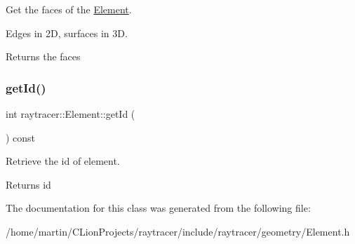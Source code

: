 Get the faces of the \hyperlink{classraytracer_1_1Element}{Element}. 

Edges in 2D, surfaces in 3D. \begin{DoxyReturn}{Returns}
the faces 
\end{DoxyReturn}
\mbox{\label{classraytracer_1_1Element_ab56fe71038371416a91db232b27c006a}} 
\subsubsection{\texorpdfstring{get\+Id()}{getId()}}
{\footnotesize\ttfamily int raytracer\+::\+Element\+::get\+Id (\begin{DoxyParamCaption}{ }\end{DoxyParamCaption}) const}



Retrieve the id of element. 

\begin{DoxyReturn}{Returns}
id 
\end{DoxyReturn}


The documentation for this class was generated from the following file\+:\begin{DoxyCompactItemize}
\item 
/home/martin/\+C\+Lion\+Projects/raytracer/include/raytracer/geometry/Element.\+h\end{DoxyCompactItemize}
